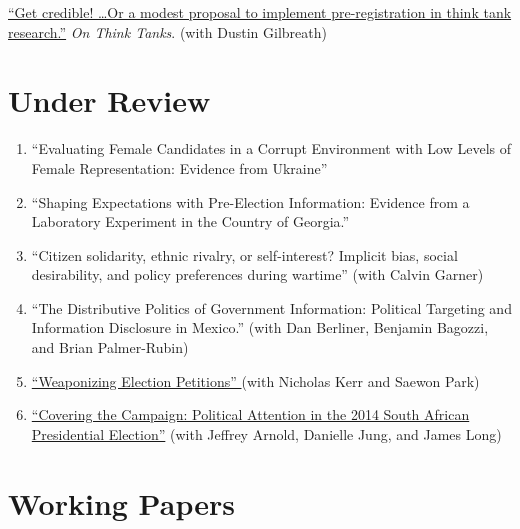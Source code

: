 \documentclass[margin,line]{res}
\begin{document}
{\begin{resume}
\begin{etaremune}
\href{https://onthinktanks.org/articles/get-credible-or-a-modest-proposal-to-implement-pre-registration-in-think-tank-research/}{``Get
credible! …Or a modest proposal to implement pre-registration in think
tank research.''} \emph{On Think Tanks}. (with Dustin Gilbreath)
\end{etaremune}

\section{\sc Under Review}
\renewcommand{\labelenumi}{UR\theenumi.}

\begin{enumerate}

\item ``Evaluating Female Candidates in a Corrupt Environment with Low
Levels of Female Representation: Evidence from Ukraine''

\item ``Shaping Expectations with Pre-Election Information:
Evidence from a Laboratory Experiment in the Country of Georgia.''

\item ``Citizen solidarity, ethnic rivalry, or self-interest? Implicit bias,
social desirability, and policy preferences during wartime'' (with
Calvin Garner)

\item ``The Distributive Politics of Government Information: Political Targeting and Information Disclosure in Mexico.'' (with Dan Berliner, Benjamin Bagozzi,
and Brian Palmer-Rubin)

\item \href {10.31219/osf.io/tsmvz}{``Weaponizing Election Petitions'' }(with
  Nicholas Kerr and Saewon Park)

  \item\href{https://osf.io/preprints/socarxiv/af9jq/}{``Covering the Campaign: Political Attention in the 2014 South African
Presidential Election''} (with Jeffrey Arnold, Danielle Jung, and James Long)

\end{enumerate}


\section{\sc Working Papers}
\renewcommand{\labelenumi}{WP\theenumi.}

\begin{enumerate}


\end{enumerate}
\end{resume}}
\end{document}
